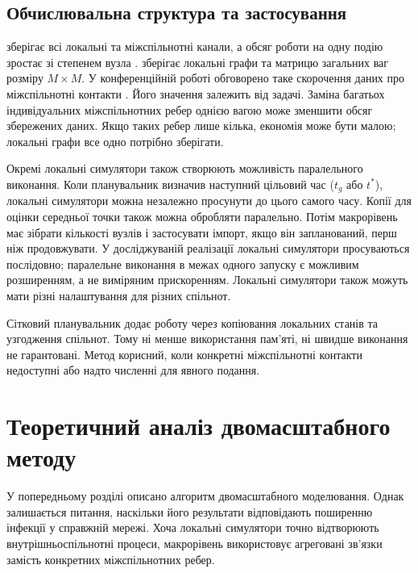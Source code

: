 \subsection{Обчислювальна структура та застосування}
\label{sec:cost}

\Full{} зберігає всі локальні та міжспільнотні канали, а обсяг роботи на одну подію зростає зі степенем вузла \citep{kuryliak2025simulating}. \TS{} зберігає локальні графи та матрицю загальних ваг розміру $M\times M$. У конференційній роботі обговорено таке скорочення даних про міжспільнотні контакти \citep{kuryliak2025towards}. Його значення залежить від задачі. Заміна багатьох індивідуальних міжспільнотних ребер однією вагою може зменшити обсяг збережених даних. Якщо таких ребер лише кілька, економія може бути малою; локальні графи все одно потрібно зберігати.

Окремі локальні симулятори також створюють можливість паралельного виконання. Коли планувальник визначив наступний цільовий час ($t_g$ або $t^\ast$), локальні симулятори можна незалежно просунути до цього самого часу. Копії для оцінки середньої точки також можна обробляти паралельно. Потім макрорівень має зібрати кількості вузлів і застосувати імпорт, якщо він запланований, перш ніж продовжувати. У досліджуваній реалізації локальні симулятори просуваються послідовно; паралельне виконання в межах одного запуску є можливим розширенням, а не виміряним прискоренням. Локальні симулятори також можуть мати різні налаштування для різних спільнот.

Сітковий планувальник додає роботу через копіювання локальних станів та узгодження спільнот. Тому ні менше використання пам'яті, ні швидше виконання не гарантовані. Метод корисний, коли конкретні міжспільнотні контакти недоступні або надто численні для явного подання.



\section{Теоретичний аналіз двомасштабного методу }
\label{sec:analysis}

У попередньому розділі описано алгоритм двомасштабного моделювання. Однак залишається питання, наскільки його результати відповідають поширенню інфекції у справжній мережі. Хоча локальні симулятори точно відтворюють внутрішньоспільнотні процеси, макрорівень використовує агреговані зв'язки замість конкретних міжспільнотних ребер.

